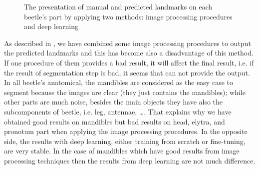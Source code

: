 \documentclass[review]{elsarticle}
\begin{document}
\begin{figure}[htbp]
    \caption{The presentation of manual and predicted landmarks on each beetle's part by applying two methods: image processing procedures and deep learning }
    \label{figmn5parts}
\end{figure}

As described in \cite{le2017maelab}, we have combined some image processing procedures to output the predicted landmarks and this has become also a disadvantage of this method. If one procedure of them provides a bad result, it will affect the final result, i.e. if the result of segmentation step is bad, it seems that can not provide the output. In all beetle's anatomical, the mandibles are considered as the easy case to segment because the images are clear (they just contains the mandibles); while other parts are much noise, besides the main objects they have also the subcomponents of beetle, i.e. leg, antennae, \ldots. That explains why we have obtained good results on mandibles but bad results on head, elytra, and pronotum part when applying the image processing procedures. In the opposite side, the results with deep learning, either training from scratch or fine-tuning, are very stable. In the case of mandibles which have good results from image processing techniques then the results from deep learning are not much difference.
\end{document}
